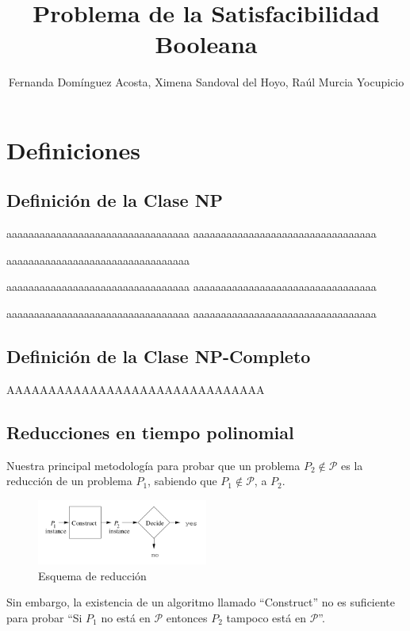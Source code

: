 \documentclass[a4paper]{article}
\title{Problema de la Satisfacibilidad Booleana}
\author{Fernanda Domínguez Acosta, Ximena Sandoval del Hoyo, Raúl Murcia Yocupicio}
\begin{document}
\maketitle


\section{Definiciones}

\subsection{Definición de la Clase NP}

aaaaaaaaaaaaaaaaaaaaaaaaaaaaaaaaa
aaaaaaaaaaaaaaaaaaaaaaaaaaaaaaaaa


aaaaaaaaaaaaaaaaaaaaaaaaaaaaaaaaa

aaaaaaaaaaaaaaaaaaaaaaaaaaaaaaaaa
aaaaaaaaaaaaaaaaaaaaaaaaaaaaaaaaa


aaaaaaaaaaaaaaaaaaaaaaaaaaaaaaaaa
aaaaaaaaaaaaaaaaaaaaaaaaaaaaaaaaa


\subsection{Definición de la Clase NP-Completo}

AAAAAAAAAAAAAAAAAAAAAAAAAAAAAAA

\subsection{Reducciones en tiempo polinomial}
Nuestra principal metodología para probar que un problema $P_2 \notin \mathcal{P}$ es la reducción de un problema $P_1$, sabiendo que $P_1 \notin \mathcal{P}$, a $P_2$.

\begin{figure}[h]
\centering
\graphicspath{ {./Images/} }
\includegraphics[width=0.5\textwidth]{reduccion.png}
\caption{\label{fig:Reduccion}Esquema de reducción\cite{hopcroft2001introduction}}
\end{figure}
Sin embargo, la existencia de un algoritmo llamado ``Construct'' no es suficiente para probar ``Si $P_1$ no está en $\mathcal{P}$ entonces $P_2$ tampoco está en $\mathcal{P}$''.
\end{document}
